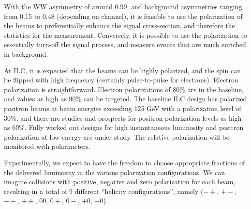 \documentclass[12pt]{article}
\begin{document}
With the WW asymmetry of around 0.99, and background asymmetries ranging from 0.15 to 0.48 (depending on channel), it is feasible 
to use the polarization of the beams to preferentially enhance the signal cross-section, and therefore the statistics for the measurement. 
Conversely, it is possible to use the polarization to essentially turn-off the signal process, and measure events that are 
much enriched in background.

At ILC, it is expected that the beams can be highly polarized, and the spin can 
be flipped with high frequency (certainly pulse-to-pulse for electrons).
Electron polarization is straightforward.
Electron polarizations of 80\% are in the baseline, and values as high as 90\% can be targeted. 
The baseline ILC design has polarized positron beams at beam energies exceeding 125 GeV with 
a polarization level of 30\%, and there are studies and prospects for positron polarization levels as high as 60\%. 
Fully worked out designs for high instantaneous luminosity and positron polarization at low energy are under study.
The relative polarization will be monitored with polarimeters.

Experimentally, we expect to have the freedom to choose appropriate fractions of the delivered luminosity in the various 
polarization configurations. We can imagine collisions with positive, negative and zero polarization for each beam, resulting 
in a total of 9 different ``helicity configurations'', namely ($-+$, $+-$, $--$, $++$, $00$, $0+$, $0-$, $+0$, $-0$).
\end{document}
